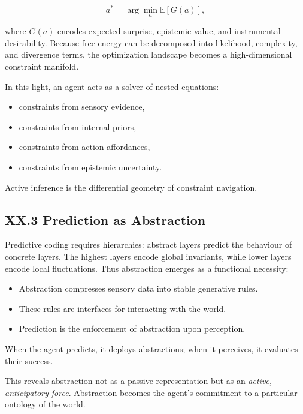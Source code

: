 \documentclass[12pt,letterpaper]{article}
\begin{document}
\[
a^\ast = \arg\min_a \mathbb{E}[G(a)],
\]

where \(G(a)\) encodes expected surprise, epistemic value, and instrumental desirability.  
Because free energy can be decomposed into likelihood, complexity, and divergence terms, the optimization landscape becomes a high-dimensional constraint manifold.

In this light, an agent acts as a solver of nested equations:

\begin{itemize}
    \item constraints from sensory evidence,
    \item constraints from internal priors,
    \item constraints from action affordances,
    \item constraints from epistemic uncertainty.
\end{itemize}

Active inference is the differential geometry of constraint navigation.

\subsection{XX.3 Prediction as Abstraction}

Predictive coding requires hierarchies: abstract layers predict the behaviour of concrete layers.  
The highest layers encode global invariants, while lower layers encode local fluctuations.  
Thus abstraction emerges as a functional necessity:

\begin{itemize}
    \item Abstraction compresses sensory data into stable generative rules.
    \item These rules are interfaces for interacting with the world.
    \item Prediction is the enforcement of abstraction upon perception.
\end{itemize}

When the agent predicts, it deploys abstractions; when it perceives, it evaluates their success.

This reveals abstraction not as a passive representation but as an \emph{active, anticipatory force}.  
Abstraction becomes the agent’s commitment to a particular ontology of the world.
\end{document}
